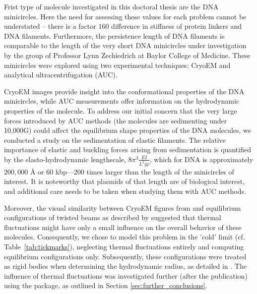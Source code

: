 \documentclass{doctoral}
\newcommand{\code}[1]{\texttt{\detokenize{#1}}}
\begin{document}
Frist type of molecule investigated in this doctoral thesis are the DNA minicircles. Here the need for assessing these values for each problem cannot be understated -- there is a factor $160$ difference in stiffness of protein linkers and DNA filaments. Furthermore, the persistence length of DNA filaments is comparable to the length of the very short DNA minicircles under investigation by the group of Professor Lynn Zechiedrich at Baylor College of Medicine. These minicircles were explored using two experimental techniques: CryoEM\cite{Irobalieva_2015} and analytical ultracentrifugation (AUC)\cite{Waszkiewicz_2023_dna}.

CryoEM images provide insight into the conformational properties of the DNA minicircles, while AUC measurements offer information on the hydrodynamic properties of the molecule. To address our initial concern that the very large forces introduced by AUC methods (the molecules are sedimenting under 10,000G) could affect the equilibrium shape properties of the DNA molecules, we conducted a study on the sedimentation of elastic filaments\cite{Waszkiewicz_2021_stability}. The relative importance of elastic and buckling forces arising from sedimentation is quantified by the elasto-hydrodynamic lengthscale, $8\pi^3 \frac{EI}{L^2 g\rho}$, which for DNA is approximately $200,000$ Å or $60$ kbp—200 times larger than the length of the minicircles of interest. It is noteworthy that plasmids of that length are of biological interest, and additional care needs to be taken when studying them with AUC methods.

Moreover, the visual similarity between CryoEM figures from \textcite{Irobalieva_2015} and equilibrium configurations of twisted beams as described by \textcite{Coleman_2000} suggested that thermal fluctuations might have only a small influence on the overall behavior of these molecules. Consequently, we chose to model this problem in the 'cold' limit (cf. Table~\ref{tab:tickmarks}), neglecting thermal fluctuations entirely and computing equilibrium configurations only. Subsequently, these configurations were treated as rigid bodies when determining the hydrodynamic radius, as detailed in \textcite{Waszkiewicz_2023_dna}. The influence of thermal fluctuations was investigated further (after the publication) using the \code{pychastic} package, as outlined in Section \ref{sec:further_conclusions}.
\end{document}
